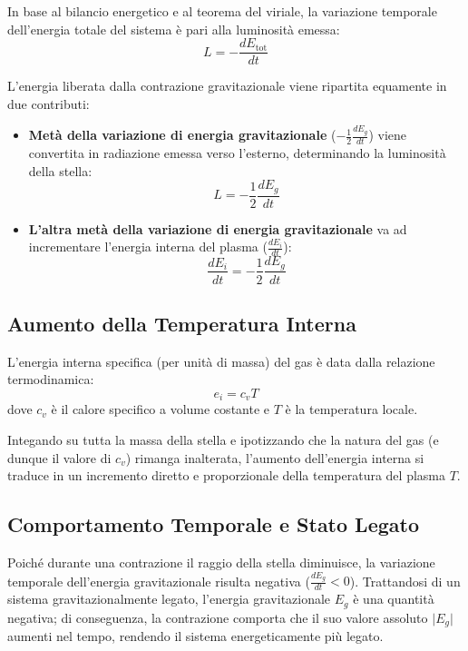 In base al bilancio energetico e al teorema del viriale, la variazione temporale dell'energia totale del sistema è pari alla luminosità emessa:
\begin{equation}
L = -\frac{dE_{\text{tot}}}{dt}
\end{equation}

L'energia liberata dalla contrazione gravitazionale viene ripartita equamente in due contributi:
\begin{itemize}
\item \textbf{Metà della variazione di energia gravitazionale} ($-\frac{1}{2} \frac{dE_g}{dt}$) viene convertita in radiazione emessa verso l'esterno, determinando la luminosità della stella:
\begin{equation}
L = -\frac{1}{2} \frac{dE_g}{dt}
\end{equation}
\item \textbf{L'altra metà della variazione di energia gravitazionale} va ad incrementare l'energia interna del plasma ($\frac{dE_i}{dt}$):
\begin{equation}
\frac{dE_i}{dt} = -\frac{1}{2} \frac{dE_g}{dt}
\end{equation}
\end{itemize}

\subsection{Aumento della Temperatura Interna}
L'energia interna specifica (per unità di massa) del gas è data dalla relazione termodinamica:
\begin{equation}
e_i = c_v T
\end{equation}
dove $c_v$ è il calore specifico a volume costante e $T$ è la temperatura locale.

Integando su tutta la massa della stella e ipotizzando che la natura del gas (e dunque il valore di $c_v$) rimanga inalterata, l'aumento dell'energia interna si traduce in un incremento diretto e proporzionale della temperatura del plasma $T$.

\subsection{Comportamento Temporale e Stato Legato}
Poiché durante una contrazione il raggio della stella diminuisce, la variazione temporale dell'energia gravitazionale risulta negativa ($\frac{dE_g}{dt} < 0$). Trattandosi di un sistema gravitazionalmente legato, l'energia gravitazionale $E_g$ è una quantità negativa; di conseguenza, la contrazione comporta che il suo valore assoluto $\vert{}E_g\vert{}$ aumenti nel tempo, rendendo il sistema energeticamente più legato.

